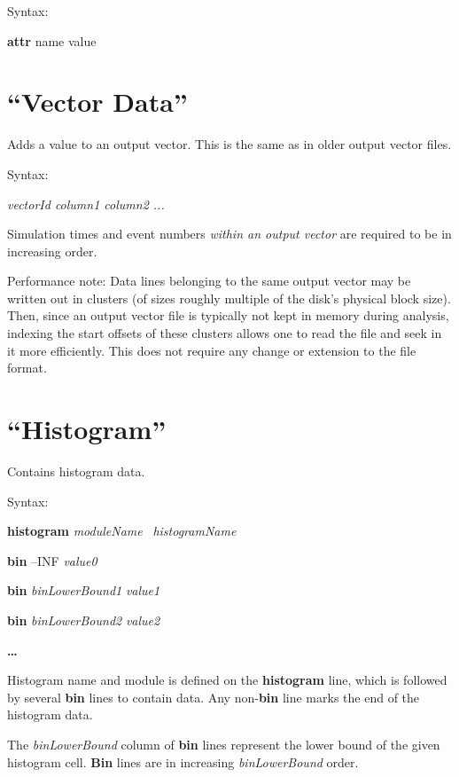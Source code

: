 Syntax:

\hspace{20mm} \textbf{attr} name value

\section{``Vector Data''}

Adds a value to an output vector. This is the same as in older output
vector files.

Syntax:

\hspace{20mm} {\itshape vectorId column1 column2 ...}

Simulation times and event numbers \textit{within an output vector} are
required to be in increasing order.

Performance note: Data lines belonging to the same output vector may be
written out in clusters (of sizes roughly multiple of the disk's
physical block size). Then, since an output vector file is typically
not kept in memory during analysis, indexing the start offsets of these
clusters allows one to read the file and seek in it more efficiently.
This does not require any change or extension to the file format.

\section{``Histogram''}

Contains histogram data.

Syntax:

\hspace{20mm} \textbf{histogram} \textit{moduleName} \ \textit{histogramName}

\hspace{20mm} \textbf{bin} {--}INF \textit{value0}

\hspace{20mm} \textbf{bin} \textit{binLowerBound1} \textit{value1}

\hspace{20mm} \textbf{bin} \textit{binLowerBound2} \textit{value2}

\hspace{20mm} \textbf{{\dots}}

Histogram name and module is defined on the \textbf{histogram} line,
which is followed by several \textbf{bin} lines to contain data. Any
non{}-\textbf{bin} line marks the end of the histogram data.

The \textit{binLowerBound }column of \textbf{bin} lines represent the
lower bound of the given histogram cell. \textbf{Bin} lines are in
increasing \textit{binLowerBound} order.

